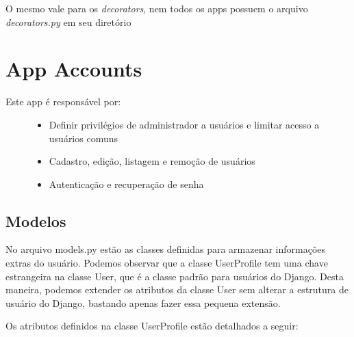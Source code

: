 \documentclass[letterpaper,10pt,brazil]{sphinxmanual}
\begin{document}
O mesmo vale para os \emph{decorators}, nem todos os apps possuem o arquivo \emph{decorators.py} em seu diretório


\section{App Accounts}
\label{apps/accounts:accounts}\label{apps/accounts:app-accounts}\label{apps/accounts::doc}\begin{description}
\item[{Este app é responsável por:}] \leavevmode\begin{itemize}
\item {} 
Definir privilégios de administrador a usuários e limitar acesso a usuários comuns

\item {} 
Cadastro, edição, listagem e remoção de usuários

\item {} 
Autenticação e recuperação de senha

\end{itemize}

\end{description}


\subsection{Modelos}
\label{apps/accounts:module-accounts.models}\label{apps/accounts:modelos}
No arquivo models.py estão as classes definidas para armazenar informações extras do usuário. Podemos observar que a classe UserProfile tem uma chave estrangeira na classe User, que é a classe padrão para usuários do Django. Desta maneira, podemos extender os atributos da classe User sem alterar a estrutura de usuário do Django, bastando apenas fazer essa pequena extensão.

Os atributos definidos na classe UserProfile estão detalhados a seguir:
\end{document}
